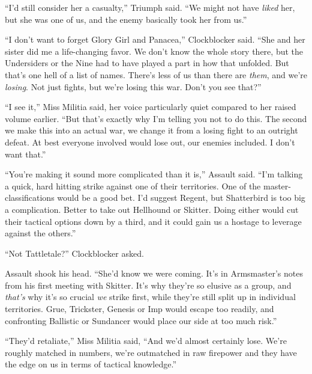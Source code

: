 ``I'd still consider her a casualty,'' Triumph said.  ``We might not have \emph{liked} her, but she was one of us, and the enemy basically took her from us.''



``I don't want to forget Glory Girl and Panacea,'' Clockblocker said.  ``She and her sister did me a life-changing favor.  We don't know the whole story there, but the Undersiders or the Nine had to have played a part in how that unfolded.  But that's one hell of a list of names.  There's less of us than there are \emph{them}, and we're \emph{losing}.  Not just fights, but we're losing this war.  Don't you see that?''



``I see it,'' Miss Militia said, her voice particularly quiet compared to her raised volume earlier.  ``But that's exactly why I'm telling you not to do this.  The second we make this into an actual war, we change it from a losing fight to an outright defeat.  At best everyone involved would lose out, our enemies included.  I don't want that.''



``You're making it sound more complicated than it is,'' Assault said.  ``I'm talking a quick, hard hitting strike against one of their territories.  One of the master-classifications would be a good bet.  I'd suggest Regent, but Shatterbird is too big a complication.  Better to take out Hellhound or Skitter.  Doing either would cut their tactical options down by a third, and it could gain us a hostage to leverage against the others.''



``Not Tattletale?'' Clockblocker asked.



Assault shook his head.  ``She'd know we were coming.  It's in Armsmaster's notes from his first meeting with Skitter.  It's why they're so elusive as a group, and \emph{that's} why it's so crucial \emph{we} strike first, while they're still split up in individual territories.  Grue, Trickster, Genesis or Imp would escape too readily, and confronting Ballistic or Sundancer would place our side at too much risk.''



``They'd retaliate,'' Miss Militia said, ``And we'd almost certainly lose.  We're roughly matched in numbers, we're outmatched in raw firepower and they have the edge on us in terms of tactical knowledge.''



